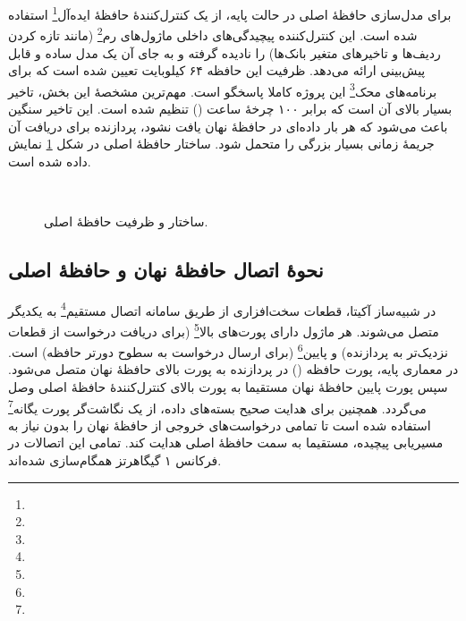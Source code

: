 برای مدل‌سازی حافظهٔ اصلی در حالت پایه، از یک کنترل‌کنندهٔ حافظهٔ ایده‌آل\footnote{} استفاده شده است. این کنترل‌کننده پیچیدگی‌های داخلی ماژول‌های رم\footnote{} (مانند تازه کردن ردیف‌ها و تاخیرهای متغیر بانک‌ها) را نادیده گرفته و به جای آن یک مدل ساده و قابل پیش‌بینی ارائه می‌دهد. 
ظرفیت این حافظه ۶۴ کیلوبایت تعیین شده است که برای برنامه‌های محک\footnote{} این پروژه کاملا پاسخگو است. مهم‌ترین مشخصهٔ این بخش، تاخیر بسیار بالای آن است که برابر ۱۰۰ چرخهٔ ساعت () تنظیم شده است. این تاخیر سنگین باعث می‌شود که هر بار داده‌ای در حافظهٔ نهان یافت نشود، پردازنده برای دریافت آن جریمهٔ زمانی بسیار بزرگی را متحمل شود. ساختار حافظهٔ اصلی در شکل \ref{main memory} نمایش داده شده است.

\begin{figure}[ht]
	‫
	\caption{ساختار و ظرفیت حافظهٔ اصلی.}
	\label{main memory}
\end{figure}

\subsection{نحوهٔ اتصال حافظهٔ نهان و حافظهٔ اصلی}

در شبیه‌ساز آکیتا، قطعات سخت‌افزاری از طریق سامانه اتصال مستقیم\footnote{} به یکدیگر متصل می‌شوند. هر ماژول دارای پورت‌های بالا\footnote{} (برای دریافت درخواست از قطعات نزدیک‌تر به پردازنده) و پایین\footnote{} (برای ارسال درخواست به سطوح دورتر حافظه) است.
در معماری پایه، پورت حافظه () در پردازنده به پورت بالای حافظهٔ نهان متصل می‌شود. سپس پورت پایین حافظهٔ نهان مستقیما به پورت بالای کنترل‌کنندهٔ حافظهٔ اصلی وصل می‌گردد. همچنین برای هدایت صحیح بسته‌های داده، از یک نگاشت‌گر پورت یگانه\footnote{} استفاده شده است تا تمامی درخواست‌های خروجی از حافظهٔ نهان را بدون نیاز به مسیریابی پیچیده، مستقیما به سمت حافظهٔ اصلی هدایت کند. تمامی این اتصالات در فرکانس ۱ گیگاهرتز همگام‌سازی شده‌اند.

